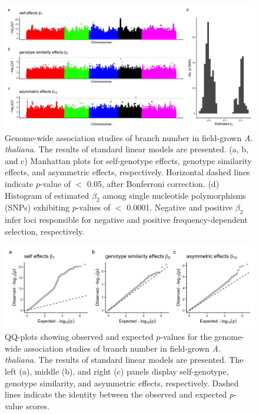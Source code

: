\documentclass[12pt,]{article}
\begin{document}
\begin{figure}[]
  \includegraphics[width=\linewidth]{ManhattanLM.png}
  \caption{Genome-wide association studies of branch number in field-grown \textit{A. thaliana}. The results of standard linear models are presented. (a, b, and c) Manhattan plots for self-genotype effects, genotype similarity effects, and asymmetric effects, respectively. Horizontal dashed lines indicate $p$-value of $<$ 0.05, after Bonferroni correction. (d) Histogram of estimated $\beta_2$ among single nucleotide polymorphisms (SNPs) exhibiting $p$-values of $<$ 0.0001. Negative and positive $\beta_2$ infer loci responsible for negative and positive frequency-dependent selection, respectively.}
  \label{figS10:gwasLM}
\end{figure}


\begin{figure}[]
  \includegraphics[width=\linewidth]{QQplotLM.png}
  \caption{QQ-plots showing observed and expected $p$-values for the genome-wide association studies of branch number in field-grown \textit{A. thaliana}. The results of standard linear models are presented. The left (a), middle (b), and right (c) panels display self-genotype, genotype similarity, and asymmetric effects, respectively. Dashed lines indicate the identity between the observed and expected $p$-value scores.}
  \label{figS11:QQplotLM}
\end{figure}
\end{document}
